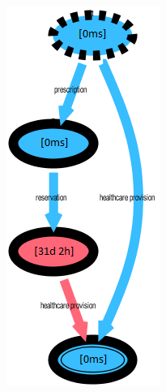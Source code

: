\begin{figure} [htbp]
\begin{minipage}[t]{0.3\textwidth}
\includegraphics[width=\textwidth]{AmbulatorioSojournYoungs}

\end{minipage}
\end{figure}
